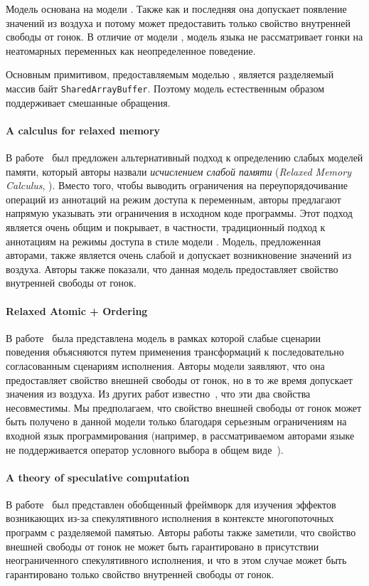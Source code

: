 Модель \JSMM основана на модели \CMM. 
Также как и последняя она допускает появление значений из воздуха
и потому может предоставить только свойство внутренней свободы от гонок. 
В отличие от модели \CMM, модель языка \JS не рассматривает
гонки на неатомарных переменных как неопределенное поведение. 

Основным примитивом, предоставляемым моделью \JSMM, 
является разделяемый массив байт \texttt{SharedArrayBuffer}. 
Поэтому модель естественным образом поддерживает смешанные обращения. 

\paragraph{A calculus for relaxed memory}

В работе~\cite{Crary-Sullivan:POPL15} был предложен
альтернативный подход к определению слабых моделей памяти, 
который авторы назвали \emph{исчислением слабой памяти}
(\emph{Relaxed Memory Calculus}, \RMC).
Вместо того, чтобы выводить ограничения на переупорядочивание 
операций из аннотаций на режим доступа к переменным, 
авторы предлагают напрямую указывать эти ограничения
в исходном коде программы. 
Этот подход является очень общим и покрывает, в частности, 
традиционный подход к аннотациям на режимы доступа в стиле модели \CMM. 
Модель, предложенная авторами, также является очень слабой 
и допускает возникновение значений из воздуха. 
Авторы также показали, что данная модель предоставляет 
свойство внутренней свободы от гонок. 

\paragraph{Relaxed Atomic + Ordering}

В работе~\cite{Saraswat-al:PPoPP07} была представлена 
модель \RAO в рамках которой слабые сценарии поведения объясняются 
путем применения трансформаций к последовательно согласованным 
сценариям исполнения. 
Авторы модели заявляют, что она предоставляет 
свойство внешней свободы от гонок,
но в то же время допускает значения из воздуха. 
Из других работ известно~\cite{Batty-al:ESOP15}, что эти два свойства несовместимы. 
Мы предполагаем, что свойство внешней свободы от гонок
может быть получено в данной модели только 
благодаря серьезным ограничениям на входной язык программирования 
(например, в рассматриваемом авторами языке не поддерживается оператор 
условного выбора в общем виде~\cite{PichonPharabod-Sewell:POPL16}).

\paragraph{A theory of speculative computation}

В работе~\cite{Boudol-Petri:ESOP10} был представлен 
обобщенный фреймворк для изучения эффектов возникающих 
из-за спекулятивного исполнения в контексте многопоточных программ
с разделяемой памятью. 
Авторы работы также заметили, что свойство 
внешней свободы от гонок не может быть гарантировано
в присутствии неограниченного спекулятивного исполнения, 
и что в этом случае может быть гарантировано
только свойство внутренней свободы от гонок. 
